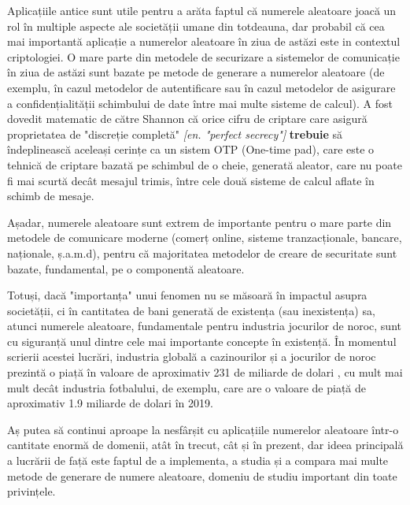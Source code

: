 Aplicațiile antice sunt utile pentru a arăta faptul că numerele aleatoare joacă un rol în multiple aspecte ale societății umane din totdeauna, dar probabil că cea mai importantă aplicație a numerelor aleatoare în ziua de astăzi este in contextul criptologiei. O mare parte din metodele de securizare a sistemelor de comunicație în ziua de astăzi sunt bazate pe metode de generare a numerelor aleatoare (de exemplu, în cazul metodelor de autentificare sau în cazul metodelor de asigurare a confidențialității schimbului de date între mai multe sisteme de calcul). A fost dovedit matematic de către Shannon \cite{art:shannon:secrecy:1949} că orice cifru de criptare care asigură proprietatea de "discreție completă" \textit{[en. "perfect secrecy"]} \textbf{trebuie} să îndeplinească aceleași cerințe ca un sistem OTP (One-time pad), care este o tehnică de criptare bazată pe schimbul de o cheie, generată aleator, care nu poate fi mai scurtă decât mesajul trimis, între cele două sisteme de calcul aflate în schimb de mesaje.

Așadar, numerele aleatoare sunt extrem de importante pentru o mare parte din metodele de comunicare moderne (comerț online, sisteme tranzacționale, bancare, naționale, ș.a.m.d), pentru că majoritatea metodelor de creare de securitate sunt bazate, fundamental, pe o componentă aleatoare.

Totuși, dacă "importanța" unui fenomen nu se măsoară în impactul asupra societății, ci în cantitatea de bani generată de existența (sau inexistența) sa, atunci numerele aleatoare, fundamentale pentru industria jocurilor de noroc, sunt cu siguranță unul dintre cele mai importante concepte în existență. În momentul scrierii acestei lucrări, industria globală a cazinourilor și a jocurilor de noroc prezintă o piață în valoare de aproximativ 231 de miliarde de dolari \cite{misc:web:statista:gambling}, cu mult mai mult decât industria fotbalului, de exemplu, care are o valoare de piață de aproximativ 1.9 miliarde de dolari în 2019.

Aș putea să continui aproape la nesfârșit cu aplicațiile numerelor aleatoare într-o cantitate enormă de domenii, atât în trecut, cât și în prezent, dar ideea principală a lucrării de față este faptul de a implementa, a studia și a compara mai multe metode de generare de numere aleatoare, domeniu de studiu important din toate privințele.

\pagebreak

